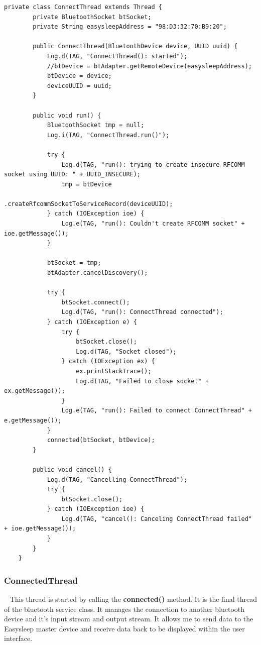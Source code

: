 \documentclass[12pt,a4paper]{article}
\begin{document}
    \begin{lstlisting}[label={lst:connectThread}, caption=ConnectThread class]
     private class ConnectThread extends Thread {
        private BluetoothSocket btSocket;
        private String easysleepAddress = "98:D3:32:70:B9:20";

        public ConnectThread(BluetoothDevice device, UUID uuid) {
            Log.d(TAG, "ConnectThread(): started");
            //btDevice = btAdapter.getRemoteDevice(easysleepAddress);
            btDevice = device;
            deviceUUID = uuid;
        }

        public void run() {
            BluetoothSocket tmp = null;
            Log.i(TAG, "ConnectThread.run()");

            try {
                Log.d(TAG, "run(): trying to create insecure RFCOMM socket using UUID: " + UUID_INSECURE);
                tmp = btDevice
                        .createRfcommSocketToServiceRecord(deviceUUID);
            } catch (IOException ioe) {
                Log.e(TAG, "run(): Couldn't create RFCOMM socket" + ioe.getMessage());
            }

            btSocket = tmp;
            btAdapter.cancelDiscovery();

            try {
                btSocket.connect();
                Log.d(TAG, "run(): ConnectThread connected");
            } catch (IOException e) {
                try {
                    btSocket.close();
                    Log.d(TAG, "Socket closed");
                } catch (IOException ex) {
                    ex.printStackTrace();
                    Log.d(TAG, "Failed to close socket" + ex.getMessage());
                }
                Log.e(TAG, "run(): Failed to connect ConnectThread" + e.getMessage());
            }
            connected(btSocket, btDevice);
        }

        public void cancel() {
            Log.d(TAG, "Cancelling ConnectThread");
            try {
                btSocket.close();
            } catch (IOException ioe) {
                Log.d(TAG, "cancel(): Canceling ConnectThread failed" + ioe.getMessage());
            }
        }
    }
    \end{lstlisting}

    \subsubsection*{ConnectedThread}~\cite{bib:connectedThread}
    This thread is started by calling the {\bfseries connected()} method. It is the final thread of the bluetooth service class. It manages the connection to another bluetooth device and it's input stream and output stream. It allows me to send data to the Easysleep master device and receive data back to be displayed within the user interface.\\
    
\end{document}

